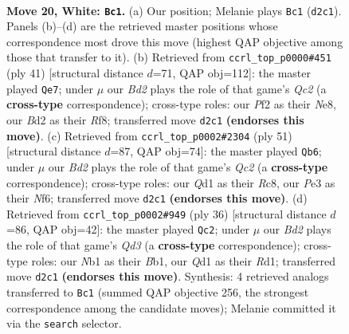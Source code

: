 \documentclass[11pt]{article}
\begin{document}
\clearpage

\begin{figure}[p]\centering
\begin{subfigure}{0.46\textwidth}\centering
\resizebox{\linewidth}{!}{%
\newchessgame
\chessboard[
  setfen={r3r3/1ppb1pkp/2nq4/p2p2b1/3P2P1/NP2P3/P2B1P2/RN1QRK2 w - - 3 20},
  showmover=false,
  pgfstyle=straightmove, color=movearrow, markmove={d2-c1}
]}
\caption{}
\end{subfigure}\hfill
\begin{subfigure}{0.46\textwidth}\centering
\resizebox{\linewidth}{!}{%
\newchessgame
\chessboard[
  setfen={3rnrk1/2q2p1p/p1bp2p1/1p6/4PQB1/P1NR4/1PP3PP/5R1K b - - 2 21},
  showmover=false,
  pgfstyle=straightmove, color=movearrow, markmove={c7-e7}
]}
\caption{}
\end{subfigure}
\\[4pt]
\begin{subfigure}{0.46\textwidth}\centering
\resizebox{\linewidth}{!}{%
\newchessgame
\chessboard[
  setfen={2r2r2/2q3pk/3p1nbp/p2p4/1p1P1B1Q/4NP1P/PP4PK/R3R3 b - - 8 26},
  showmover=false,
  pgfstyle=straightmove, color=movearrow, markmove={c7-b6}
]}
\caption{}
\end{subfigure}\hfill
\begin{subfigure}{0.46\textwidth}\centering
\resizebox{\linewidth}{!}{%
\newchessgame
\chessboard[
  setfen={2rr2k1/pb3pp1/1p2p2p/2n5/3PPq2/3Q1N1P/P4PP1/1B1RR1K1 w - - 1 19},
  showmover=false,
  pgfstyle=straightmove, color=movearrow, markmove={d3-c2}
]}
\caption{}
\end{subfigure}
\caption{\textbf{Move 20, White: \texttt{Bc1}.} (a) Our position; Melanie plays \texttt{Bc1} (\texttt{d2c1}). Panels (b)--(d) are the retrieved master positions whose correspondence most drove this move (highest QAP objective among those that transfer to it). (b) Retrieved from \texttt{ccrl\_top\_p0000\#451} (ply 41) [structural distance $d$=71, QAP obj=112]: the master played \texttt{Qe7}; under $\mu$ our \emph{Bd2} plays the role of that game's \emph{Qc2} (a \textbf{cross-type} correspondence); cross-type roles: our \emph{P}f2 as their \emph{N}e8, our \emph{B}d2 as their \emph{R}f8; transferred move \texttt{d2c1} \textbf{(endorses this move)}. (c) Retrieved from \texttt{ccrl\_top\_p0002\#2304} (ply 51) [structural distance $d$=87, QAP obj=74]: the master played \texttt{Qb6}; under $\mu$ our \emph{Bd2} plays the role of that game's \emph{Qc2} (a \textbf{cross-type} correspondence); cross-type roles: our \emph{Q}d1 as their \emph{R}c8, our \emph{P}e3 as their \emph{N}f6; transferred move \texttt{d2c1} \textbf{(endorses this move)}. (d) Retrieved from \texttt{ccrl\_top\_p0002\#949} (ply 36) [structural distance $d$=86, QAP obj=42]: the master played \texttt{Qc2}; under $\mu$ our \emph{Bd2} plays the role of that game's \emph{Qd3} (a \textbf{cross-type} correspondence); cross-type roles: our \emph{N}b1 as their \emph{B}b1, our \emph{Q}d1 as their \emph{R}d1; transferred move \texttt{d2c1} \textbf{(endorses this move)}. Synthesis: 4 retrieved analogs transferred to \texttt{Bc1} (summed QAP objective 256, the strongest correspondence among the candidate moves); Melanie committed it via the \texttt{search} selector.}
\label{fig:thought-m38}
\end{figure}
\end{document}
